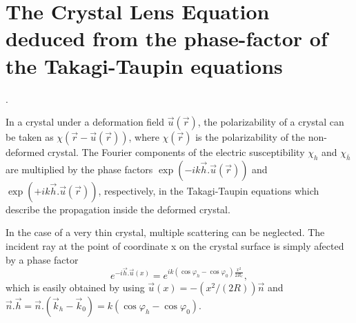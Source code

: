 \documentclass[preprint]{iucr}              %
\begin{document}




\appendix
\section{The Crystal Lens Equation deduced from the phase-factor of the Takagi-Taupin equations}
\label{appendix:CLE}.

In a crystal under a deformation field $\vec u(\vec r)$, the polarizability of a crystal can be taken as $\chi(\vec r-\vec u(\vec r))$, where $\chi(\vec r)$ is the polarizability of the non-deformed crystal. The Fourier components of the electric susceptibility $\chi_h$ and $\chi_{\bar h}$ are multiplied by the phase factors $\exp(-i k \vec h . \vec u (\vec r))$ and $\exp(+i k \vec h . \vec u (\vec r))$, respectively, in the Takagi-Taupin equations which describe  the propagation inside the deformed crystal.

In the case of a very thin crystal, multiple scattering can be neglected. The incident ray at the point of coordinate x on the crystal surface is simply afected by a phase factor 
\begin{equation}
    e^{-i \vec h . \vec u(x)} = e^{i k (\cos\varphi_h-\cos\varphi_0) \frac{x^2}{2 R_c} },
\end{equation}
which is easily obtained by using $\vec u(x) = -(x^2/(2R))\vec n$ and $\vec n . \vec h = \vec n.(\vec k_h - \vec k_0) = k(\cos\varphi_h-\cos\varphi_0)$. 
\end{document}
